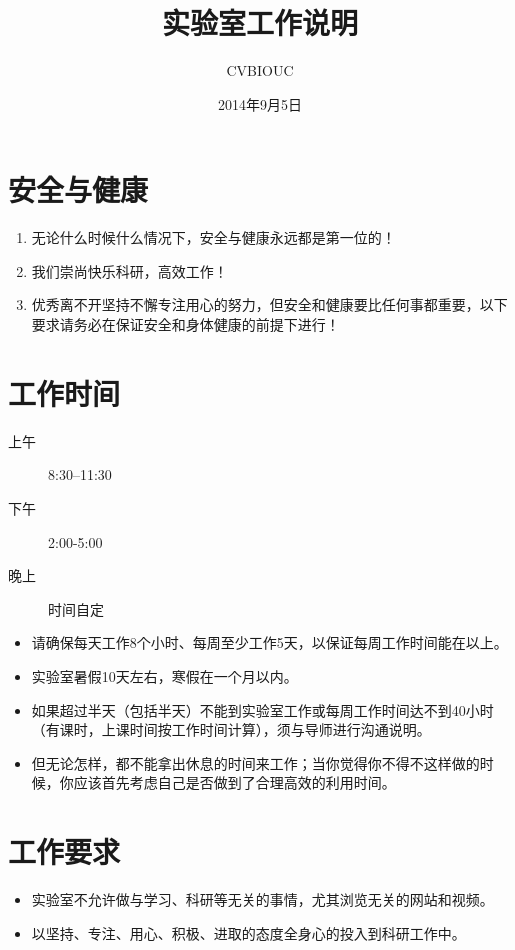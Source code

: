 \documentclass[a4paper，12pt]{article}
\title{实验室工作说明} %
\author{CVBIOUC}
\date{2014年9月5日} %
\begin{document}
\maketitle

\section{安全与健康}

\begin{enumerate}
\item 无论什么时候什么情况下，安全与健康永远都是第一位的！
\item 我们崇尚快乐科研，高效工作！
\item 优秀离不开坚持不懈专注用心的努力，但安全和健康要比任何事都重要，以下要求请务必在保证安全和身体健康的前提下进行！
\end{enumerate}

\section{工作时间}

\begin{description}
\item[上午] 8:30--11:30
\item[下午] 2:00-5:00
\item[晚上] 时间自定
\end{description}

\begin{itemize}
\item 请确保每天工作8个小时、每周至少工作5天，以保证每周工作时间能在{\color{red}{40小时}}以上。
\item 实验室暑假10天左右，寒假在一个月以内。
\item 如果超过半天（包括半天）不能到实验室工作或每周工作时间达不到40小时（有课时，上课时间按工作时间计算），须与导师进行沟通说明。
\item 但无论怎样，都不能拿出休息的时间来工作；当你觉得你不得不这样做的时候，你应该首先考虑自己是否做到了合理高效的利用时间。
\end{itemize}

\section{工作要求}

\begin{itemize}
\item 实验室不允许做与学习、科研等无关的事情，尤其浏览无关的网站和视频。
\item 以坚持、专注、用心、积极、进取的态度全身心的投入到科研工作中。
\end{itemize}
\end{document}
